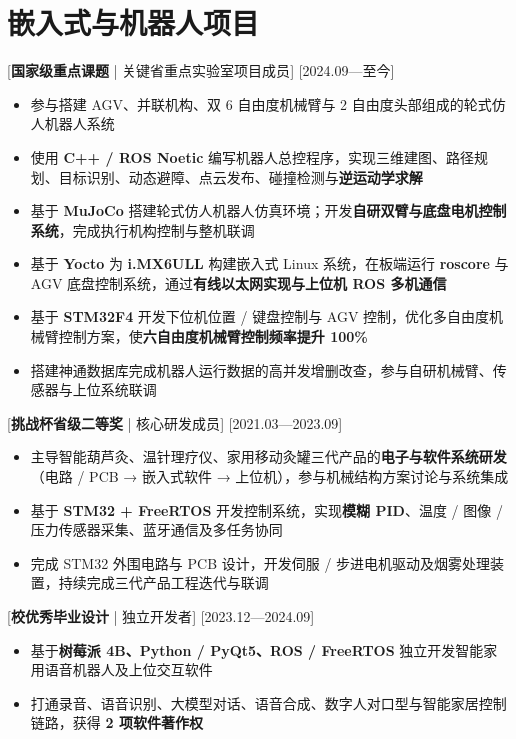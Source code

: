 \documentclass{resume-photo}
\newcommand{\hl}[1]{\textbf{\textcolor{hlred}{#1}}}
\begin{document}
\section{嵌入式与机器人项目}

[\textnormal{\hl{国家级重点课题} | 关键省重点实验室项目成员}]
[2024.09—至今]

\begin{itemize}
  \item 参与搭建 AGV、并联机构、双 6 自由度机械臂与 2 自由度头部组成的轮式仿人机器人系统
  \item 使用 \hl{C++ / ROS Noetic} 编写机器人总控程序，实现三维建图、路径规划、目标识别、动态避障、点云发布、碰撞检测与\hl{逆运动学求解}
  \item 基于 \hl{MuJoCo} 搭建轮式仿人机器人仿真环境；开发\hl{自研双臂与底盘电机控制系统}，完成执行机构控制与整机联调
  \item 基于 \hl{Yocto} 为 \hl{i.MX6ULL} 构建嵌入式 Linux 系统，在板端运行 \hl{roscore} 与 AGV 底盘控制系统，通过\hl{有线以太网实现与上位机 ROS 多机通信}
  \item 基于 \hl{STM32F4} 开发下位机位置 / 键盘控制与 AGV 控制，优化多自由度机械臂控制方案，使\hl{六自由度机械臂控制频率提升 100\%}
  \item 搭建神通数据库完成机器人运行数据的高并发增删改查，参与自研机械臂、传感器与上位系统联调
\end{itemize}

[\textnormal{\hl{挑战杯省级二等奖} | 核心研发成员}]
[2021.03—2023.09]

\begin{itemize}
  \item 主导智能葫芦灸、温针理疗仪、家用移动灸罐三代产品的\hl{电子与软件系统研发}（电路 / PCB → 嵌入式软件 → 上位机），参与机械结构方案讨论与系统集成
  \item 基于 \hl{STM32 + FreeRTOS} 开发控制系统，实现\hl{模糊 PID}、温度 / 图像 / 压力传感器采集、蓝牙通信及多任务协同
  \item 完成 STM32 外围电路与 PCB 设计，开发伺服 / 步进电机驱动及烟雾处理装置，持续完成三代产品工程迭代与联调
\end{itemize}

[\textnormal{\hl{校优秀毕业设计} | 独立开发者}]
[2023.12—2024.09]

\begin{itemize}
  \item 基于\hl{树莓派 4B、Python / PyQt5、ROS / FreeRTOS} 独立开发智能家用语音机器人及上位交互软件
  \item 打通录音、语音识别、大模型对话、语音合成、数字人对口型与智能家居控制链路，获得 \hl{2 项软件著作权}
\end{itemize}
\end{document}
